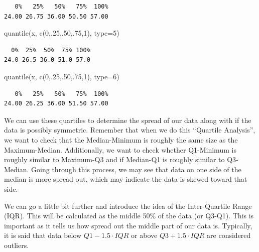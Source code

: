 \documentclass[
  letterpaper,
  DIV=11,
  numbers=noendperiod]{scrreprt}
\newenvironment{Shaded}{\begin{snugshade}}{\end{snugshade}}
\newcommand{\AttributeTok}[1]{\textcolor[rgb]{0.40,0.45,0.13}{#1}}
\newcommand{\DecValTok}[1]{\textcolor[rgb]{0.68,0.00,0.00}{#1}}
\newcommand{\FunctionTok}[1]{\textcolor[rgb]{0.28,0.35,0.67}{#1}}
\newcommand{\NormalTok}[1]{\textcolor[rgb]{0.00,0.23,0.31}{#1}}
\begin{document}
\begin{verbatim}
   0%   25%   50%   75%  100% 
24.00 26.75 36.00 50.50 57.00 
\end{verbatim}

\begin{Shaded}
\begin{Highlighting}[]
\FunctionTok{quantile}\NormalTok{(x, }\FunctionTok{c}\NormalTok{(}\DecValTok{0}\NormalTok{,.}\DecValTok{25}\NormalTok{,.}\DecValTok{50}\NormalTok{,.}\DecValTok{75}\NormalTok{,}\DecValTok{1}\NormalTok{), }\AttributeTok{type=}\DecValTok{5}\NormalTok{)}
\end{Highlighting}
\end{Shaded}

\begin{verbatim}
  0%  25%  50%  75% 100% 
24.0 26.5 36.0 51.0 57.0 
\end{verbatim}

\begin{Shaded}
\begin{Highlighting}[]
\FunctionTok{quantile}\NormalTok{(x, }\FunctionTok{c}\NormalTok{(}\DecValTok{0}\NormalTok{,.}\DecValTok{25}\NormalTok{,.}\DecValTok{50}\NormalTok{,.}\DecValTok{75}\NormalTok{,}\DecValTok{1}\NormalTok{), }\AttributeTok{type=}\DecValTok{6}\NormalTok{)}
\end{Highlighting}
\end{Shaded}

\begin{verbatim}
   0%   25%   50%   75%  100% 
24.00 26.25 36.00 51.50 57.00 
\end{verbatim}

We can use these quartiles to determine the spread of our data along
with if the data is possibly symmetric. Remember that when we do this
``Quartile Analysis'', we want to check that the Median-Minimum is
roughly the same size as the Maximum-Median. Additionally, we want to
check whether Q1-Minimum is roughly similar to Maximum-Q3 and if
Median-Q1 is roughly similar to Q3-Median. Going through this process,
we may see that data on one side of the median is more spread out, which
may indicate the data is skewed toward that side.

We can go a little bit further and introduce the idea of the
Inter-Quartile Range (IQR). This will be calculated as the middle 50\%
of the data (or Q3-Q1). This is important as it tells us how spread out
the middle part of our data is. Typically, it is said that data below
\(Q1-1.5\cdot IQR\) or above \(Q3+1.5\cdot IQR\) are considered
outliers.
\end{document}
